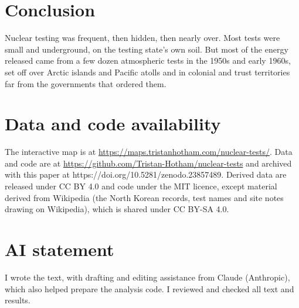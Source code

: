 \documentclass[11pt,a4paper]{article}
\begin{document}
\section{Conclusion}
Nuclear testing was frequent, then hidden, then nearly over. Most tests were small and underground, on the testing state's own soil. But most of the energy released came from a few dozen atmospheric tests in the 1950s and early 1960s, set off over Arctic islands and Pacific atolls and in colonial and trust territories far from the governments that ordered them.

\section*{Data and code availability}
The interactive map is at \url{https://maps.tristanhotham.com/nuclear-tests/}. Data and code are at \url{https://github.com/Tristan-Hotham/nuclear-tests} and archived with this paper at https://doi.org/10.5281/zenodo.23857489. Derived data are released under CC BY 4.0 and code under the MIT licence, except material derived from Wikipedia (the North Korean records, test names and site notes drawing on Wikipedia), which is shared under CC BY-SA 4.0.

\section*{AI statement}
I wrote the text, with drafting and editing assistance from Claude (Anthropic), which also helped prepare the analysis code. I reviewed and checked all text and results.
\end{document}
